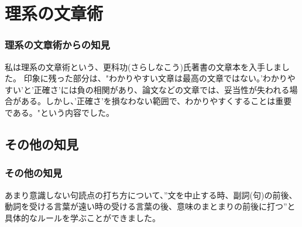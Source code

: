 \documentclass[aspectratio=169,dvipdfmx,12pt,a4j,handout]{beamer}
\begin{document}
\section{理系の文章術}
\begin{frame}\frametitle{理系の文章術からの知見}
  私は理系の文章術という、更科功(さらしなこう)氏著書の文章本を入手しました。\pause
  印象に残った部分は、"わかりやすい文章は最高の文章ではない。\pause 'わかりやすい'と'正確さ'には負の相関があり、論文などの文章では、妥当性が失われる場合がある。\pause しかし、'正確さ'を損なわない範囲で、わかりやすくすることは重要である。"という内容でした。
\end{frame}

\subsection{その他の知見}
\begin{frame}\frametitle{その他の知見}
  あまり意識しない句読点の打ち方について、\pause ”文を中止する時、\pause 副詞(句)の前後、\pause 動詞を受ける言葉が遠い時の受ける言葉の後、\pause 意味のまとまりの前後に打つ”\pause と具体的なルールを学ぶことができました。
\end{frame}
\end{document}
